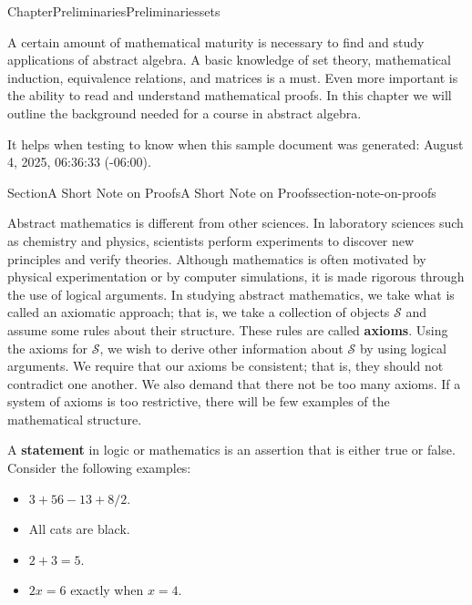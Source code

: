 \documentclass[oneside,10pt,]{book}
\newcommand{\terminology}[1]{\textbf{#1}}
\numberwithin{equation}{section}
\begin{document}
\begin{chapterptx}{Chapter}{Preliminaries}{}{Preliminaries}{}{}{sets}
\renewcommand*{\chaptername}{Chapter}
\begin{introduction}{}%
A certain amount of mathematical maturity is necessary to find and study applications of abstract algebra.  A basic knowledge of set theory, mathematical induction, equivalence relations, and matrices is a must.  Even more important is the ability to read and understand mathematical proofs.  In this chapter we will outline the background needed for a course in abstract algebra.%
\par
It helps when testing to know when this sample document was generated: August 4, 2025, 06:36:33 (-06:00).%
\end{introduction}%
%
%
\typeout{************************************************}
\typeout{************************************************}
%
\begin{sectionptx}{Section}{A Short Note on Proofs}{}{A Short Note on Proofs}{}{}{section-note-on-proofs}
\begin{introduction}{}%
Abstract mathematics is different from other sciences. In laboratory sciences such as chemistry and physics, scientists perform experiments to discover new principles and verify theories.  Although mathematics is often motivated by physical experimentation or by computer simulations, it is made rigorous through the use of logical arguments.  In studying abstract mathematics, we take what is called an  axiomatic approach; that is, we take a collection of objects \(\mathcal S\) and assume some rules about their structure.  These rules are called \terminology{axioms}.  Using the axioms for \(\mathcal S\), we wish to derive other information about \(\mathcal S\) by using logical arguments.  We require that our axioms be consistent; that is, they should not contradict one another.  We also demand that there not be too many axioms. If a system of axioms is too restrictive,  there will be few examples of the mathematical structure.%
\par
A \terminology{statement} in logic or mathematics is an assertion that is either true or false.  Consider the following examples:%
\begin{itemize}[label=\textbullet]
\item{}\(3 + 56 - 13 + 8/2 \).%
\item{}All cats are black.%
\item{}\(2 + 3 = 5\).%
\item{}\(2x = 6\) exactly when \(x = 4\).%

\end{itemize}
\end{introduction}
\end{sectionptx}
\end{chapterptx}
\end{document}
